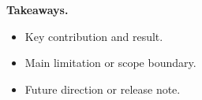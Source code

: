 \textbf{Takeaways.}
\begin{itemize}
    \item Key contribution and result.
    \item Main limitation or scope boundary.
    \item Future direction or release note.
\end{itemize}

\vspace{1.2cm}
\begin{center}
\qrcode{\PosterRepositoryUrl}

\vspace{1.0cm}
\Large\textbf{\PosterRepositoryText}
\end{center}
